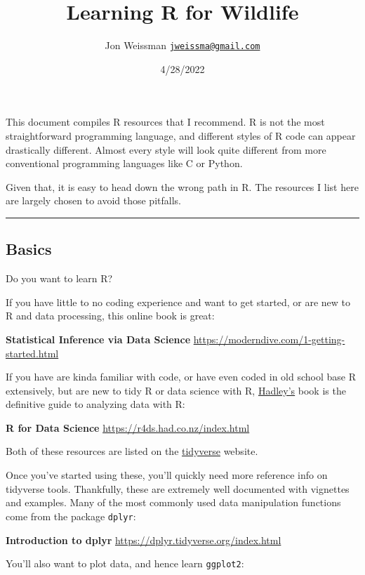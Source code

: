 \documentclass[
]{article}
\title{Learning R for Wildlife}
\author{Jon Weissman
\href{mailto:jweissma@gmail.com}{\nolinkurl{jweissma@gmail.com}}}
\date{4/28/2022}
\begin{document}
\maketitle

{
\setcounter{tocdepth}{2}
\tableofcontents
}
This document compiles R resources that I recommend. R is not the most
straightforward programming language, and different styles of R code can
appear drastically different. Almost every style will look quite
different from more conventional programming languages like C or Python.

Given that, it is easy to head down the wrong path in R. The resources I
list here are largely chosen to avoid those pitfalls.

\begin{center}\rule{0.5\linewidth}{0.5pt}\end{center}

\hypertarget{basics}{%
\subsection{Basics}\label{basics}}

Do you want to learn R?

If you have little to no coding experience and want to get started, or
are new to R and data processing, this online book is great:

\textbf{Statistical Inference via Data Science}
\url{https://moderndive.com/1-getting-started.html}

If you have are kinda familiar with code, or have even coded in old
school base R extensively, but are new to tidy R or data science with R,
\href{https://github.com/hadley}{Hadley's} book is the definitive guide
to analyzing data with R:

\textbf{R for Data Science} \url{https://r4ds.had.co.nz/index.html}

Both of these resources are listed on the
\href{https://www.tidyverse.org/learn/}{tidyverse} website.

Once you've started using these, you'll quickly need more reference info
on tidyverse tools. Thankfully, these are extremely well documented with
vignettes and examples. Many of the most commonly used data manipulation
functions come from the package \texttt{dplyr}:

\textbf{Introduction to dplyr}
\url{https://dplyr.tidyverse.org/index.html}

You'll also want to plot data, and hence learn \texttt{ggplot2}:
\end{document}
